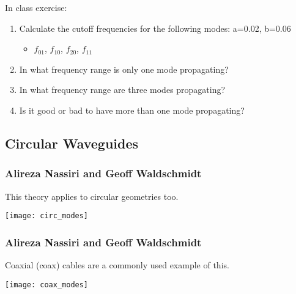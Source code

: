 \documentclass[professionalfonts,t]{beamer}
\begin{document}
{\begin{frame}
	In class exercise:
	\begin{enumerate}
		\item Calculate the cutoff frequencies for the following modes: a=0.02, b=0.06
		\begin{itemize}
			\item $f_{01}$, $f_{10}$, $f_{20}$, $f_{11}$
		\end{itemize}
		\item In what frequency range is only one mode propagating?
		\item In what frequency range are three modes propagating?
		\item Is it good or bad to have more than one mode propagating?
	\end{enumerate}	
\end{frame}


\subsection{Circular Waveguides}
\begin{frame}
\frametitle{Alireza Nassiri and Geoff Waldschmidt}
This theory applies to circular geometries too.

\centering
	\texttt{[image: circ\_modes]}
	\vspace{-1em}
\end{frame}
\begin{frame}
\frametitle{Alireza Nassiri and Geoff Waldschmidt}
Coaxial (coax) cables are a commonly used example of this.

\centering
	\texttt{[image: coax\_modes]}
	\vspace{-1em}
\end{frame}

}

\fi


\iftrue
\end{document}
